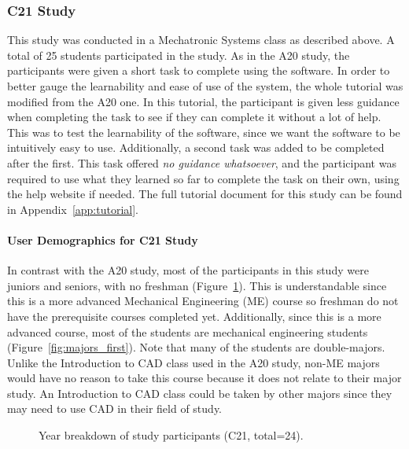\begin{doublespace}
\subsubsection{C21 Study}

This study was conducted in a Mechatronic Systems class as described above. A total of 25 students participated in the study. As in the A20 study, the participants were given a short task to complete using the software. In order to better gauge the learnability and ease of use of the system, the whole tutorial was modified from the A20 one. In this tutorial, the participant is given less guidance when completing the task to see if they can complete it without a lot of help. This was to test the learnability of the software, since we want the software to be intuitively easy to use. Additionally, a second task was added to be completed after the first. This task offered \emph{no guidance whatsoever}, and the participant was required to use what they learned so far to complete the task on their own, using the help website if needed. The full tutorial document for this study can be found in Appendix~\ref{app:tutorial}.

\paragraph{User Demographics for C21 Study}
In contrast with the A20 study, most of the participants in this study were juniors and seniors, with no freshman (Figure~\ref{fig:grades_first}). This is understandable since this is a more advanced Mechanical Engineering (ME) course so freshman do not have the prerequisite courses completed yet. Additionally, since this is a more advanced course, most of the students are mechanical engineering students (Figure~\ref{fig:majors_first}). Note that many of the students are double-majors. Unlike the Introduction to CAD class used in the A20 study, non-ME majors would have no reason to take this course because it does not relate to their major study. An Introduction to CAD class could be taken by other majors since they may need to use CAD in their field of study.

\begin{figure}[htbp]
    \centering
    \caption{Year breakdown of study participants (C21, total=24).}
    \label{fig:grades_first}
\end{figure}


\end{doublespace}
